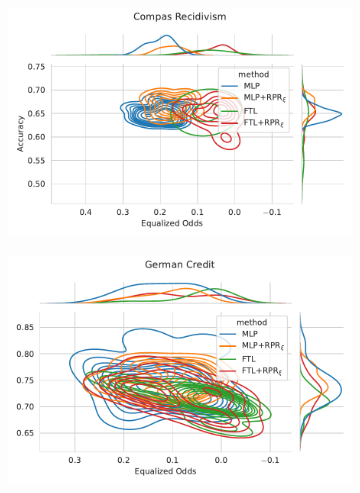 \begin{figure}
\begin{subfigure}{.45\linewidth}
    \includegraphics[width=1\linewidth]{images/pareto_acc_odds_compas_rpr.pdf}
\end{subfigure}
\begin{subfigure}{.45\linewidth}
    \includegraphics[width=1\linewidth]{images/pareto_acc_odds_german_rpr.pdf}
\end{subfigure}
\end{figure}
